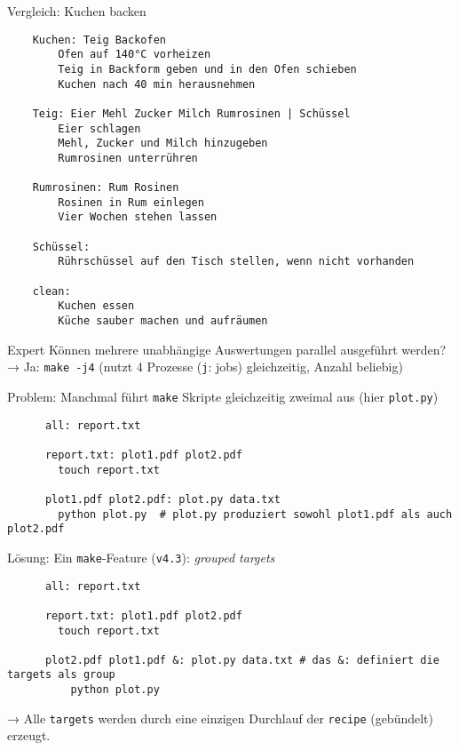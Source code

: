 
\begin{frame}[fragile]{Vergleich: Kuchen backen}
  \begin{center}
    \begin{verbatim}
    Kuchen: Teig Backofen
        Ofen auf 140°C vorheizen
        Teig in Backform geben und in den Ofen schieben
        Kuchen nach 40 min herausnehmen

    Teig: Eier Mehl Zucker Milch Rumrosinen | Schüssel
        Eier schlagen
        Mehl, Zucker und Milch hinzugeben
        Rumrosinen unterrühren

    Rumrosinen: Rum Rosinen
        Rosinen in Rum einlegen
        Vier Wochen stehen lassen

    Schüssel:
        Rührschüssel auf den Tisch stellen, wenn nicht vorhanden

    clean:
        Kuchen essen
        Küche sauber machen und aufräumen
    \end{verbatim}
  \end{center}
\end{frame}

\begin{frame}[fragile]{Expert}
  Können mehrere unabhängige Auswertungen parallel ausgeführt werden? \\
  → Ja: \;\texttt{make -j4}\; (nutzt 4 Prozesse (\texttt{j}: jobs) gleichzeitig, Anzahl beliebig)

  Problem: Manchmal führt \texttt{make} Skripte gleichzeitig zweimal aus (hier \texttt{plot.py})
  \begin{center}
    \small
    \begin{verbatim}
      all: report.txt

      report.txt: plot1.pdf plot2.pdf
        touch report.txt

      plot1.pdf plot2.pdf: plot.py data.txt
        python plot.py  # plot.py produziert sowohl plot1.pdf als auch plot2.pdf
    \end{verbatim}
  \end{center}

  Lösung: Ein \texttt{make}-Feature (\texttt{v4.3}): \emph{grouped targets}
  \begin{center}
    \small
    \begin{verbatim}
      all: report.txt

      report.txt: plot1.pdf plot2.pdf
        touch report.txt

      plot2.pdf plot1.pdf &: plot.py data.txt # das &: definiert die targets als group 
          python plot.py

    \end{verbatim}
  \end{center}
   → Alle \texttt{targets} werden durch eine einzigen Durchlauf der \texttt{recipe} (gebündelt) erzeugt.
\end{frame}

